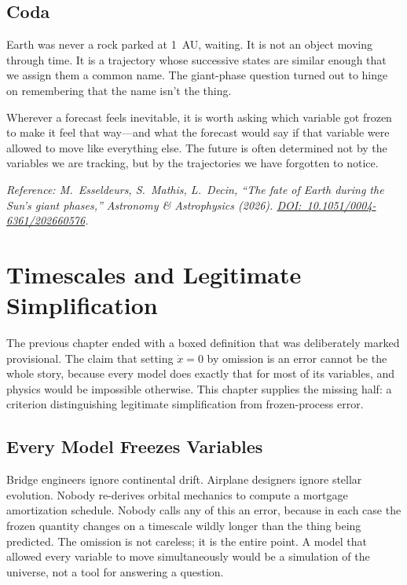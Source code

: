 \documentclass[11pt]{book}
\theoremstyle{plain}
\theoremstyle{definition}
\theoremstyle{remark}
\begin{document}
\section{Coda}

Earth was never a rock parked at 1~AU, waiting. It is not an object moving through time. It is a trajectory whose successive states are similar enough that we assign them a common name. The giant-phase question turned out to hinge on remembering that the name isn't the thing.

Wherever a forecast feels inevitable, it is worth asking which variable got frozen to make it feel that way---and what the forecast would say if that variable were allowed to move like everything else. The future is often determined not by the variables we are tracking, but by the trajectories we have forgotten to notice.

\bigskip
\noindent\textit{Reference: M.~Esseldeurs, S.~Mathis, L.~Decin, ``The fate of Earth during the Sun's giant phases,'' \textit{Astronomy \& Astrophysics} (2026). \href{https://doi.org/10.1051/0004-6361/202660576}{DOI:~10.1051/0004-6361/202660576}.}

\chapter{Timescales and Legitimate Simplification}
\label{ch:timescale}

The previous chapter ended with a boxed definition that was deliberately marked provisional. The claim that setting $\dot x = 0$ by omission is an error cannot be the whole story, because every model does exactly that for most of its variables, and physics would be impossible otherwise. This chapter supplies the missing half: a criterion distinguishing legitimate simplification from frozen-process error.

\section{Every Model Freezes Variables}

Bridge engineers ignore continental drift. Airplane designers ignore stellar evolution. Nobody re-derives orbital mechanics to compute a mortgage amortization schedule. Nobody calls any of this an error, because in each case the frozen quantity changes on a timescale wildly longer than the thing being predicted. The omission is not careless; it is the entire point. A model that allowed every variable to move simultaneously would be a simulation of the universe, not a tool for answering a question.
\end{document}
